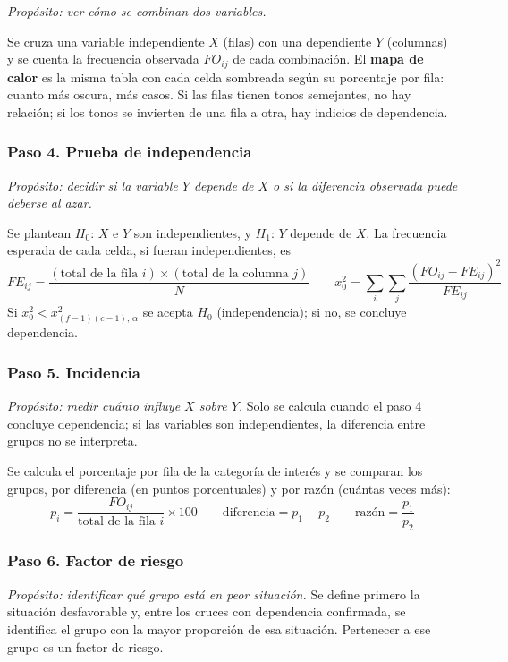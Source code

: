 \documentclass[12pt, a4paper]{article}
\begin{document}
\textit{Propósito: ver cómo se combinan dos variables.}

Se cruza una variable independiente $X$ (filas) con una dependiente $Y$
(columnas) y se cuenta la frecuencia observada $FO_{ij}$ de cada
combinación. El \textbf{mapa de calor} es la misma tabla con cada celda
sombreada según su porcentaje por fila: cuanto más oscura, más casos. Si
las filas tienen tonos semejantes, no hay relación; si los tonos se
invierten de una fila a otra, hay indicios de dependencia.

\subsubsection{Paso 4. Prueba de independencia}

\textit{Propósito: decidir si la variable $Y$ depende de $X$ o si la
diferencia observada puede deberse al azar.}

Se plantean $H_0$: $X$ e $Y$ son independientes, y $H_1$: $Y$ depende de
$X$. La frecuencia esperada de cada celda, si fueran independientes, es
\[
FE_{ij} = \frac{(\text{total de la fila } i) \times (\text{total de la columna } j)}{N}
\qquad
x_0^2 = \sum_{i}\sum_{j} \frac{(FO_{ij} - FE_{ij})^2}{FE_{ij}}
\]
Si $x_0^2 < x^2_{(f-1)(c-1),\,\alpha}$ se acepta $H_0$ (independencia); si
no, se concluye dependencia.

\subsubsection{Paso 5. Incidencia}

\textit{Propósito: medir cuánto influye $X$ sobre $Y$.} Solo se calcula
cuando el paso 4 concluye dependencia; si las variables son
independientes, la diferencia entre grupos no se interpreta.

Se calcula el porcentaje por fila de la categoría de interés y se
comparan los grupos, por diferencia (en puntos porcentuales) y por
razón (cuántas veces más):
\[
p_i = \frac{FO_{ij}}{\text{total de la fila } i} \times 100
\qquad
\text{diferencia} = p_1 - p_2
\qquad
\text{razón} = \frac{p_1}{p_2}
\]

\subsubsection{Paso 6. Factor de riesgo}

\textit{Propósito: identificar qué grupo está en peor situación.} Se
define primero la situación desfavorable y, entre los cruces con
dependencia confirmada, se identifica el grupo con la mayor proporción de
esa situación. Pertenecer a ese grupo es un factor de riesgo.
\end{document}
